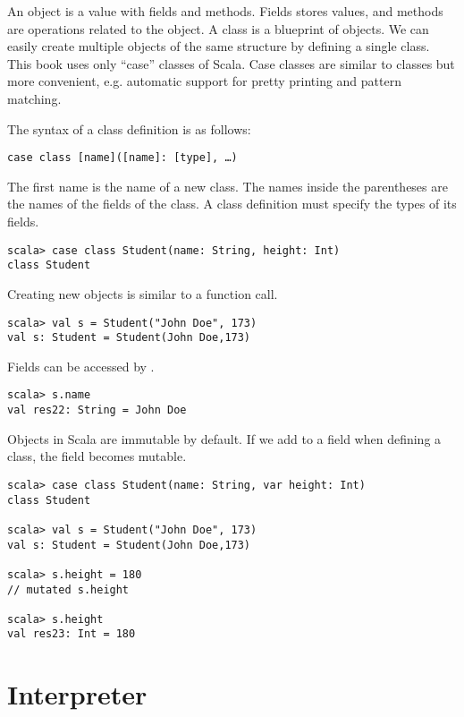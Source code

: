 An object is a value with fields and methods. Fields stores values, and methods
are operations related to the object. A class is a blueprint of objects. We can
easily create multiple objects of the same structure by defining a single class.
This book uses only ``case'' classes of Scala. Case classes are similar to
classes but more convenient, e.g. automatic support for pretty printing and
pattern matching.

The syntax of a class definition is as follows:

\begin{verbatim}
case class [name]([name]: [type], …)
\end{verbatim}

The first name is the name of a new class. The names inside
the parentheses are the names of the fields of the class. A class definition
must specify the types of its fields.

\begin{verbatim}
scala> case class Student(name: String, height: Int)
class Student
\end{verbatim}

Creating new objects is similar to a function call.

\begin{verbatim}
scala> val s = Student("John Doe", 173)
val s: Student = Student(John Doe,173)
\end{verbatim}

Fields can be accessed by .

\begin{verbatim}
scala> s.name
val res22: String = John Doe
\end{verbatim}

Objects in Scala are immutable by default. If we add  to a field when
defining a class, the field becomes mutable.

\begin{verbatim}
scala> case class Student(name: String, var height: Int)
class Student

scala> val s = Student("John Doe", 173)
val s: Student = Student(John Doe,173)

scala> s.height = 180
// mutated s.height

scala> s.height
val res23: Int = 180
\end{verbatim}

\section{Interpreter}

